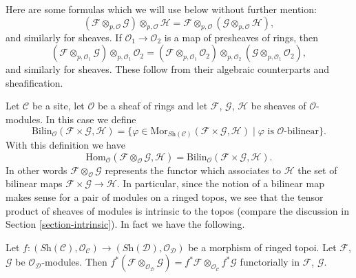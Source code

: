 \medskip\noindent
Here are some formulas which we will use below without further mention:
$$
(\mathcal{F}
\otimes_{p, \mathcal{O}} \mathcal{G})
\otimes_{p, \mathcal{O}} \mathcal{H}
=
\mathcal{F}
\otimes_{p, \mathcal{O}} (\mathcal{G}
\otimes_{p, \mathcal{O}} \mathcal{H}),
$$
and similarly for sheaves.
If $\mathcal{O}_1 \to \mathcal{O}_2$ is a map of presheaves of rings,
then
$$
(\mathcal{F} \otimes_{p, \mathcal{O}_1} \mathcal{G})
\otimes_{p, \mathcal{O}_1} \mathcal{O}_2 =
(\mathcal{F} \otimes_{p, \mathcal{O}_1} \mathcal{O}_2)
\otimes_{p, \mathcal{O}_2}
(\mathcal{G} \otimes_{p, \mathcal{O}_1} \mathcal{O}_2),
$$
and similarly for sheaves.
These follow from their algebraic counterparts and sheafification.

\medskip\noindent
Let $\mathcal{C}$ be a site, let $\mathcal{O}$ be a sheaf of rings and let
$\mathcal{F}$, $\mathcal{G}$, $\mathcal{H}$ be sheaves of
$\mathcal{O}$-modules. In this case we define
$$
\text{Bilin}_{\mathcal{O}}(\mathcal{F} \times \mathcal{G}, \mathcal{H})
=
\{\varphi \in
\text{Mor}_{\textit{Sh}(\mathcal{C})}(
\mathcal{F} \times \mathcal{G}, \mathcal{H}) \mid
\varphi \text{ is }\mathcal{O}\text{-bilinear}\}.
$$
With this definition we have
$$
\text{Hom}_{\mathcal{O}}
(\mathcal{F} \otimes_{\mathcal{O}} \mathcal{G}, \mathcal{H})
=
\text{Bilin}_{\mathcal{O}}(\mathcal{F} \times \mathcal{G}, \mathcal{H}).
$$
In other words $\mathcal{F} \otimes_{\mathcal{O}} \mathcal{G}$
represents the functor which associates to $\mathcal{H}$ the set
of bilinear maps $\mathcal{F} \times \mathcal{G} \to \mathcal{H}$.
In particular, since the notion of a bilinear map makes sense for
a pair of modules on a ringed topos, we see that the tensor
product of sheaves of modules is intrinsic to the topos (compare
the discussion in Section \ref{section-intrinsic}). In fact we
have the following.

\begin{lemma}
\label{lemma-tensor-product-pullback}
Let $f : (\textit{Sh}(\mathcal{C}), \mathcal{O}_{\mathcal{C}})
\to (\textit{Sh}(\mathcal{D}), \mathcal{O}_{\mathcal{D}})$ be
a morphism of ringed topoi. Let $\mathcal{F}$, $\mathcal{G}$
be $\mathcal{O}_{\mathcal{D}}$-modules. Then
$f^*(\mathcal{F} \otimes_{\mathcal{O}_{\mathcal{D}}} \mathcal{G})
= f^*\mathcal{F} \otimes_{\mathcal{O}_{\mathcal{C}}} f^*\mathcal{G}$
functorially in $\mathcal{F}$, $\mathcal{G}$.
\end{lemma}

